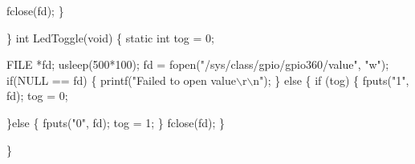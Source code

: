 \begin{DoxyCode}
                fclose(fd);
        \}

\}
\textcolor{keywordtype}{int} LedToggle(\textcolor{keywordtype}{void})
\{
    \textcolor{keyword}{static} \textcolor{keywordtype}{int} tog = 0;

    FILE *fd;
        usleep(500*100);
        fd = fopen(\textcolor{stringliteral}{"/sys/class/gpio/gpio360/value"}, \textcolor{stringliteral}{"w"});
        \textcolor{keywordflow}{if}(NULL == fd)
        \{
                printf(\textcolor{stringliteral}{"Failed to open value\(\backslash\)r\(\backslash\)n"});
        \}
    \textcolor{keywordflow}{else}
    \{
        \textcolor{keywordflow}{if} (tog)
        \{       
            fputs(\textcolor{stringliteral}{"1"}, fd);
            tog = 0;

        \}\textcolor{keywordflow}{else}
        \{
            fputs(\textcolor{stringliteral}{"0"}, fd);
            tog = 1;    
        \}
        fclose(fd);
    \}

\}
\end{DoxyCode}

